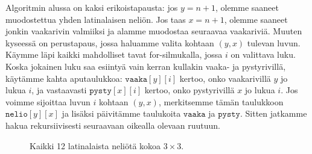 Algoritmin alussa on kaksi erikoistapausta:
jos $y=n+1$, olemme saaneet muodostettua
yhden latinalaisen neliön.
Jos taas $x=n+1$, olemme saaneet jonkin vaakarivin
valmiiksi ja alamme muodostaa seuraavaa vaakariviä.
Muuten kyseessä on perustapaus, jossa haluamme
valita kohtaan $(y,x)$ tulevan luvun.
Käymme läpi kaikki mahdolliset tavat for-silmukalla,
jossa $i$ on valittava luku.
Koska jokainen luku saa esiintyä vain kerran kullakin
vaaka- ja pystyrivillä, käytämme kahta aputaulukkoa:
$\texttt{vaaka}[y][i]$ kertoo, onko vaakarivillä $y$
jo lukua $i$, ja vastaavasti $\texttt{pysty}[x][i]$ kertoo,
onko pystyrivillä $x$ jo lukua $i$.
Jos voimme sijoittaa luvun $i$ kohtaan $(y,x)$,
merkitsemme tämän taulukkoon $\texttt{nelio}[y][x]$
ja lisäksi päivitämme taulukoita $\texttt{vaaka}$ ja $\texttt{pysty}$.
Sitten jatkamme hakua rekursiivisesti seuraavaan
oikealla olevaan ruutuun.

\begin{figure}
\center
{}
\caption{Kaikki 12 latinalaista neliötä kokoa $3 \times 3$.}
\label{fig:latnel}
\end{figure}

